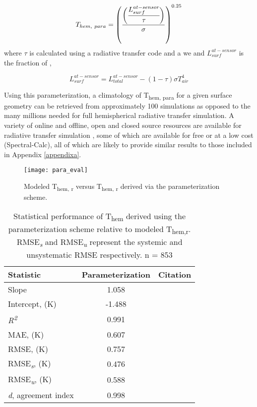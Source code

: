 \begin{bibunit}
\begin{equation}
	\label{para}
	T_{hem, ~para} =\left(\displaystyle\frac{\biggl(\cfrac{\displaystyle L_{surf}^{at-sensor}}{ \displaystyle\tau}\biggr)}{ \displaystyle\sigma}\right)^{0.25}
\end{equation}
\noindent where $\tau$ is calculated using a radiative transfer code and a we and $L_{surf}^{at-sensor}$ is the fraction of ,

\begin{equation}
	\label{para2}
	\displaystyle L_{surf}^{at-sensor} = L_{total}^{at-sensor} - (1-\tau)\sigma T_{air}^4
\end{equation}

Using this parameterization, a climatology of T\textsubscript{hem, para} for a given surface geometry can be retrieved from approximately 100 simulations as opposed to the many millions needed for full hemispherical radiative transfer simulation. A variety of online and offline, open and closed source resources are available for radiative transfer simulation \citep{Gastellu-Etchegorry1996,Berk1987,Buehler2005}, some of which are available for free or at a low cost (Spectral-Calc), all of which are likely to provide similar results to those included in Appendix \ref{appendixa}.

\begin{figure}[H]
	\centering
	\texttt{[image: para\_eval]}
	\caption{Modeled T\textsubscript{hem, r} versus T\textsubscript{hem, r} derived via the parameterization scheme.}
	\label{para_eval}
\end{figure}
 
\begin{table}[H]
 	\centering
 	\caption{Statistical performance of T\textsubscript{hem} derived using the parameterization scheme relative to modeled T\textsubscript{hem,r}. RMSE\textit{\textsubscript{s}} and RMSE\textit{\textsubscript{u}} represent the systemic and unsystematic RMSE respectively. n = 853}
 	\label{parastats}
 	\begin{tabular}{lcl}
 		\toprule 
 		Statistic & Parameterization & Citation \\  \midrule
 		Slope & 1.058 &  \\ 
 		Intercept, (\si{\kelvin}) & -1.488 &   \\ 
 		\textit{R\textsuperscript{2}} & 0.991 & \\ 
 		MAE,  (\si{\kelvin}) & 0.607& \citep{Willmott1985a} \\ 
 		RMSE,  (\si{\kelvin}) & 0.757 & \citep{Willmott1985a} \\ 
 		RMSE\textit{\textsubscript{s}},  (\si{\kelvin}) & 0.476  & \citep{Willmott1985a} \\ 
 		RMSE\textit{\textsubscript{u}},  (\si{\kelvin}) & 0.588  & \citep{Willmott1985a} \\ 
 		\textit{d}, agreement index & 0.998 & \citep{Willmott2012} \\
 		\bottomrule
 	\end{tabular} 
\end{table}
 

\end{bibunit}
